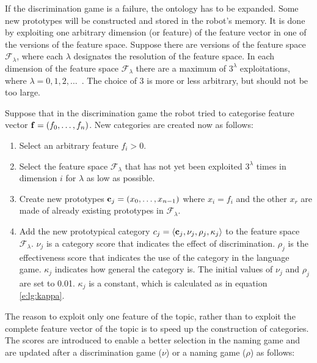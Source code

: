 If the discrimination game is a failure, the ontology has to be expanded. Some new prototypes will be constructed and stored in the robot's memory. It is done by exploiting one arbitrary dimension (or feature) of the feature vector in one of the versions of the feature space. Suppose there are versions of the feature space ${\mathcal F}_\lambda$, where each $\lambda$ designates the resolution of the feature space. In each dimension of the feature space ${\mathcal F}_\lambda$ there are a maximum of $3^\lambda$ exploitations, where $\lambda=0,1,2,\ldots$~. The choice of 3 is more or less arbitrary,\enlargethispage{1\baselineskip} but should not be too large. 

Suppose that in the discrimination game the robot tried to categorise feature vector ${\bf f}=(f_0,\ldots,f_n)$. New categories are created now as follows:

\begin{enumerate}

\item Select an arbitrary feature $f_i>0$.

\item Select the feature space ${\mathcal F}_\lambda$ that has not yet been exploited $3^\lambda$ times in dimension $i$ for $\lambda$ as low as possible.

\item Create new prototypes ${\bf c}_j = (x_0,\ldots,x_{n-1})$ where $x_i=f_i$ and the other $x_r$ are made of already existing prototypes in ${\mathcal F}_\lambda$.

\item Add the new prototypical category $c_j=\langle {\bf c}_j,\nu_j,\rho_j,\kappa_j \rangle$ to the feature space ${\mathcal F}_\lambda$. $\nu_j$ is a category score that indicates the effect of discrimination. $\rho_j$ is the effectiveness score that indicates the use of the category in the language game. $\kappa_j$ indicates how general the category is. The initial values of $\nu_j$ and $\rho_j$ are set to 0.01. $\kappa_j$ is a constant, which is calculated as in equation \ref{e:lg:kappa}. 

\end{enumerate}


The reason to exploit only one feature of the topic, rather than to exploit the complete feature vector of the topic is to speed up the construction of categories. The scores are introduced to enable a better selection in the naming game and are updated after a discrimination game ($\nu$) or a naming game ($\rho$) as follows:

